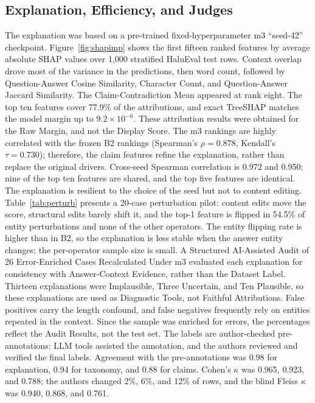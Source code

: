 \documentclass[a4paper,fleqn]{cas-sc}
\begin{document}
\subsection{Explanation, Efficiency, and Judges}

The explanation was based on a pre-trained fixed-hyperparameter m3 ``seed-42'' checkpoint. Figure~\ref{fig:shapimp} shows the first fifteen ranked features by average absolute SHAP values over 1{,}000 stratified HaluEval test rows. Context overlap drove most of the variance in the predictions, then word count, followed by Question-Answer Cosine Similarity, Character Count, and Question-Answer Jaccard Similarity. The Claim-Contradiction Mean appeared at rank eight. The top ten features cover 77.9\% of the attributions, and exact TreeSHAP matches the model margin up to $9.2\times10^{-6}$. These attribution results were obtained for the Raw Margin, and not the Display Score. The m3 rankings are highly correlated with the frozen B2 rankings (Spearman's $\rho = 0.878$, Kendall's $\tau = 0.730$); therefore, the claim features refine the explanation, rather than replace the original drivers. Cross-seed Spearman correlation is 0.972 and 0.950; nine of the top ten features are shared, and the top five features are identical. The explanation is resilient to the choice of the seed but not to content editing. Table~\ref{tab:perturb} presents a 20-case perturbation pilot: content edits move the score, structural edits barely shift it, and the top-1 feature is flipped in 54.5\% of entity perturbations and none of the other operators. The entity flipping rate is higher than in B2, so the explanation is less stable when the answer entity changes; the per-operator sample size is small. A Structured AI-Assisted Audit of 26 Error-Enriched Cases Recalculated Under m3 evaluated each explanation for consistency with Answer-Context Evidence, rather than the Dataset Label. Thirteen explanations were Implausible, Three Uncertain, and Ten Plausible, so these explanations are used as Diagnostic Tools, not Faithful Attributions. False positives carry the length confound, and false negatives frequently rely on entities repeated in the context. Since the sample was enriched for errors, the percentages reflect the Audit Results, not the test set. The labels are author-checked pre-annotations: LLM tools assisted the annotation, and the authors reviewed and verified the final labels. Agreement with the pre-annotations was 0.98 for explanation, 0.94 for taxonomy, and 0.88 for claims. Cohen's $\kappa$ was 0.965, 0.923, and 0.788; the authors changed 2\%, 6\%, and 12\% of rows, and the blind Fleiss $\kappa$ was 0.940, 0.868, and 0.761.
\end{document}
